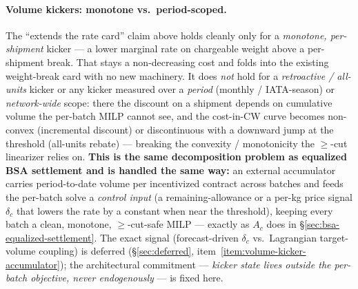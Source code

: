 \documentclass[11pt,a4paper]{article}
\theoremstyle{definition}
\begin{document}
\paragraph{Volume kickers: monotone vs.\ period-scoped.}
The ``extends the rate card'' claim above holds cleanly only for a
\emph{monotone, per-shipment} kicker --- a lower marginal rate on
chargeable weight above a per-shipment break. That stays a non-decreasing
cost and folds into the existing weight-break card with no new machinery.
It does \emph{not} hold for a \emph{retroactive / all-units} kicker or any
kicker measured over a \emph{period} (monthly / IATA-season) or
\emph{network-wide} scope: there the discount on a shipment depends on
cumulative volume the per-batch MILP cannot see, and the cost-in-CW curve
becomes non-convex (incremental discount) or discontinuous with a downward
jump at the threshold (all-units rebate) --- breaking the convexity /
monotonicity the $\geq$-cut linearizer relies on. \textbf{This is the same
decomposition problem as equalized BSA settlement and is handled the same
way:} an external accumulator carries period-to-date volume per
incentivized contract across batches and feeds the per-batch solve a
\emph{control input} (a remaining-allowance or a per-kg price signal
$\delta_c$ that lowers the rate by a constant when near the threshold),
keeping every batch a clean, monotone, $\geq$-cut-safe MILP --- exactly as
$A_c$ does in \S\ref{sec:bsa-equalized-settlement}. The exact signal
(forecast-driven $\delta_c$ vs.\ Lagrangian target-volume coupling) is
deferred (\S\ref{sec:deferred}, item~\ref{item:volume-kicker-accumulator});
the architectural commitment --- \emph{kicker state lives outside the
per-batch objective, never endogenously} --- is fixed here.
\end{document}

